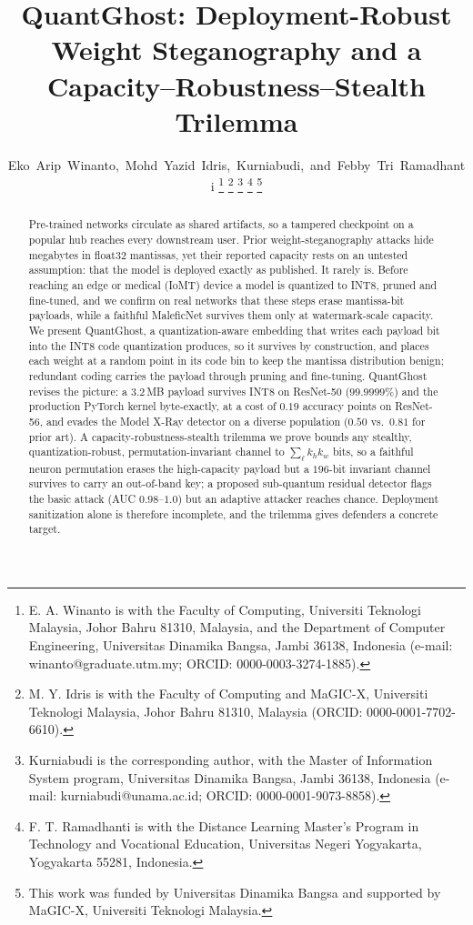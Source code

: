 \documentclass[10pt,journal]{IEEEtran}
\theoremstyle{remark}
\newcommand{\sys}{\mbox{QuantGhost}}
\begin{document}
\title{\sys: Deployment-Robust Weight Steganography and a Capacity--Robustness--Stealth Trilemma}
\author{Eko~Arip~Winanto,~Mohd~Yazid~Idris,~Kurniabudi,~and~Febby~Tri~Ramadhanti%
\thanks{E. A. Winanto is with the Faculty of Computing, Universiti Teknologi Malaysia, Johor Bahru 81310, Malaysia, and the Department of Computer Engineering, Universitas Dinamika Bangsa, Jambi 36138, Indonesia (e-mail: winanto@graduate.utm.my; ORCID: \mbox{0000-0003-3274-1885}).}%
\thanks{M. Y. Idris is with the Faculty of Computing and MaGIC-X, Universiti Teknologi Malaysia, Johor Bahru 81310, Malaysia (ORCID: \mbox{0000-0001-7702-6610}).}%
\thanks{Kurniabudi is the corresponding author, with the Master of Information System program, Universitas Dinamika Bangsa, Jambi 36138, Indonesia (e-mail: kurniabudi@unama.ac.id; ORCID: \mbox{0000-0001-9073-8858}).}%
\thanks{F. T. Ramadhanti is with the Distance Learning Master's Program in Technology and Vocational Education, Universitas Negeri Yogyakarta, Yogyakarta 55281, Indonesia.}%
\thanks{This work was funded by Universitas Dinamika Bangsa and supported by MaGIC-X, Universiti Teknologi Malaysia.}}
\maketitle
{}

\begin{abstract}
Pre-trained networks circulate as shared artifacts, so a tampered checkpoint on a popular
hub reaches every downstream user. Prior weight-steganography attacks hide megabytes in
float32 mantissas, yet their reported capacity rests on an untested assumption: that the
model is deployed exactly as published. It rarely is. Before reaching an edge or medical
(IoMT) device a model is quantized to INT8, pruned and fine-tuned, and we confirm on real
networks that these steps erase mantissa-bit payloads, while a faithful MaleficNet
survives them only at watermark-scale capacity. We present \sys, a quantization-aware
embedding that writes each payload bit into the INT8 code quantization produces, so it
survives by construction, and places each weight at a random point in its code bin to keep
the mantissa distribution benign; redundant coding carries the payload through pruning and
fine-tuning. \sys{} revises the picture: a $3.2$\,MB payload survives INT8 on ResNet-50
($99.9999\%$) and the production PyTorch kernel byte-exactly, at a cost of $0.19$ accuracy
points on ResNet-56, and evades the Model X-Ray detector on a diverse population
($0.50$ vs.\ $0.81$ for prior art). A capacity-robustness-stealth trilemma we prove bounds
any stealthy, quantization-robust, permutation-invariant channel to
$\sum_\ell k_h k_w$ bits, so a faithful neuron permutation erases the high-capacity payload
but a $196$-bit invariant channel survives to carry an out-of-band key; a proposed
sub-quantum residual detector flags the basic attack (AUC $0.98$--$1.0$) but an adaptive
attacker reaches chance. Deployment sanitization alone is therefore incomplete, and the
trilemma gives defenders a concrete target.
\end{abstract}
\end{document}
